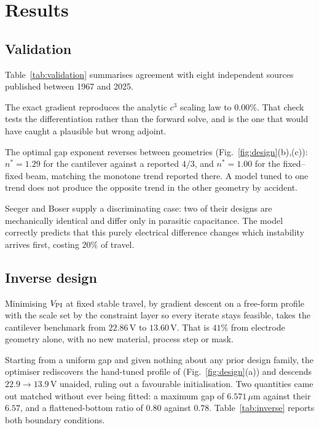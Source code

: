 \documentclass[conference,10pt]{IEEEtran}
\begin{document}
\section{Results}

\subsection{Validation}


Table~\ref{tab:validation} summarises agreement with eight independent sources
published between 1967 and 2025.

The exact gradient reproduces the analytic $c^3$ scaling law to $0.00\%$. That
check tests the differentiation rather than the forward solve, and is the one
that would have caught a plausible but wrong adjoint.

The optimal gap exponent reverses between geometries
(Fig.~\ref{fig:design}(b),(c)): $n^*\!=\!1.29$ for the cantilever against a
reported $4/3$, and $n^*\!=\!1.00$ for the fixed--fixed beam, matching the
monotone trend reported there. A model tuned to one trend does not produce the
opposite trend in the other geometry by accident.

Seeger and Boser \cite{seeger} supply a discriminating case: two of their
designs are mechanically identical and differ only in parasitic capacitance.
The model correctly predicts that this purely electrical difference changes
which instability arrives first, costing $20\%$ of travel.

\subsection{Inverse design}
Minimising $V_{\rm PI}$ at fixed stable travel, by gradient descent on a
free-form profile with the scale set by the constraint layer so every iterate
stays feasible, takes the cantilever benchmark from $22.86$\,V to $13.60$\,V.
That is $41\%$ from electrode geometry alone, with no new material, process
step or mask.

Starting from a uniform gap and given nothing about any prior design family,
the optimiser rediscovers the hand-tuned profile of \cite{haluzan}
(Fig.~\ref{fig:design}(a)) and descends $22.9\rightarrow13.9$\,V unaided,
ruling out a favourable initialisation. Two quantities came out matched without
ever being fitted: a maximum gap of $6.571\,\mu$m against their $6.57$, and a
flattened-bottom ratio of $0.80$ against $0.78$. Table~\ref{tab:inverse}
reports both boundary conditions.
\end{document}
